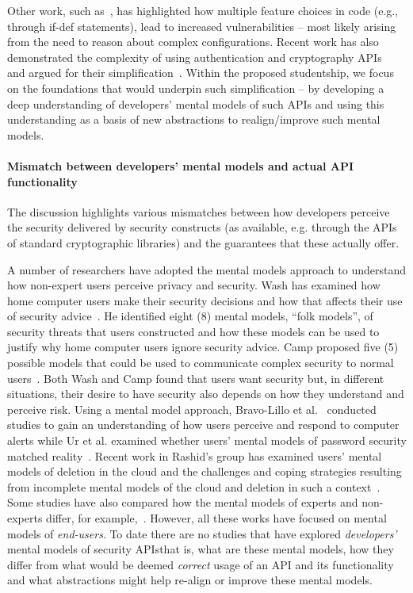 \documentclass[10pt]{article}
\begin{document}
Other work, such as~\cite{ferreira2016}, has highlighted how multiple feature choices in code (e.g., through if-def statements), lead to increased vulnerabilities -- most likely arising from the need to reason about complex configurations.
Recent work has also demonstrated the complexity of using authentication and cryptography APIs~\cite{acar2017} and argued for their simplification~\cite{arzt2015, nadi2016}. Within the proposed studentship, we focus on the foundations that would underpin such simplification -- by developing a deep understanding of developers' mental models of such APIs and using this understanding as a basis of new abstractions to realign/improve such mental models.

\paragraph{Mismatch between developers' mental models and actual API functionality}
The discussion highlights various mismatches between how developers perceive the security delivered by security constructs (as available, e.g. through the APIs of standard cryptographic libraries) and the guarantees that these actually offer. 

A number of researchers have adopted the mental models approach to understand how non-expert users perceive privacy and security. Wash has examined how home computer users make their security decisions and how that affects their use of security advice~\cite{wash2010folk}. He identified eight (8) mental models, ``folk models'', of security threats that users constructed and how these models can be used to justify why home computer users ignore security advice. Camp proposed five (5) possible models that could be used to communicate complex security to normal users~\cite{camp2009mental}. Both Wash and Camp found that users want security but, in different situations, their desire to have security also depends on how they understand and perceive risk. Using a mental model approach, Bravo-Lillo et al.~\cite{bravo2011bridging} conducted studies to gain an understanding of how users perceive and respond to computer alerts while Ur et al. examined whether users' mental models of password security matched reality~\cite{ur2016users}. Recent work in Rashid's group has examined users' mental models of deletion in the cloud and the challenges and coping strategies resulting from incomplete mental models of the cloud and deletion in such a context~\cite{ramokapane2017}. Some studies have also compared how the mental models of experts and non-experts differ, for example,~\cite{ion2015no}. However, all these works have focused on mental models of \emph{end-users}. To date there are no studies that have explored \emph{developers'} mental models of security APIs\textemdash that is, what are these mental models, how they differ from what would be deemed \emph{correct} usage of an API and its functionality and what abstractions might help re-align or improve these mental models.  
\end{document}
